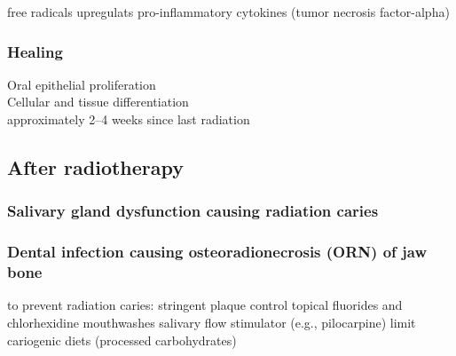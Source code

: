 \documentclass[
paper=landscape,
paper=160mm:90mm, %
fontsize=11pt, %
pagesize, %
parskip=half-, %
]{scrartcl} %
\theoremstyle{mythmstyle} %
\begin{document}
free radicals upregulats pro-inflammatory cytokines (tumor necrosis factor-alpha)\\






\subsubsection{Healing}
 Oral epithelial proliferation \\
 
 Cellular and tissue differentiation \\

 approximately 2–4 weeks since last radiation \\
\clearpage


\subsection{After radiotherapy} 

\subsubsection{Salivary gland dysfunction causing radiation caries}


\subsubsection{Dental infection causing osteoradionecrosis (ORN) of jaw bone}

\begin{outline}
\0 to prevent radiation caries:
    \1 stringent plaque control
    \1 topical fluorides and chlorhexidine mouthwashes
    \1 salivary flow stimulator (e.g., pilocarpine)
    \1 limit cariogenic diets (processed carbohydrates)

\end{outline}
\end{document}
